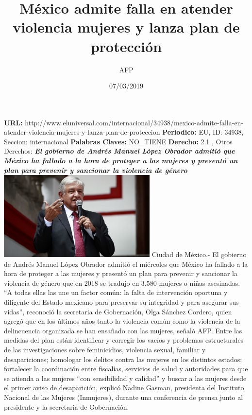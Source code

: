 \documentclass{article}%
\title{\textbf{México admite falla en atender violencia mujeres y lanza plan de protección}}%
\author{AFP}%
\date{07/03/2019}%
\begin{document}
%
\normalsize%
\maketitle%
\textbf{URL: }%
http://www.eluniversal.com/internacional/34938/mexico{-}admite{-}falla{-}en{-}atender{-}violencia{-}mujeres{-}y{-}lanza{-}plan{-}de{-}proteccion\newline%
%
\textbf{Periodico: }%
EU, %
ID: %
34938, %
Seccion: %
internacional\newline%
%
\textbf{Palabras Claves: }%
NO\_TIENE\newline%
%
\textbf{Derecho: }%
2.1%
, Otros Derechos: %
\newline%
%
\textbf{\textit{El gobierno de Andrés Manuel López Obrador admitió que México ha fallado a la hora de proteger a las mujeres y presentó un plan para prevenir y sancionar la violencia de género}}%
\newline%
\newline%
%
\includegraphics[width=300px]{EU_34938.jpg}%
\newline%
%
Ciudad de México.{-} El gobierno de Andrés Manuel López Obrador admitió el miércoles que México ha fallado a la hora de proteger a las mujeres y presentó un plan para prevenir y sancionar la violencia de género que en 2018 se tradujo en 3.580 mujeres o niñas asesinadas.%
\newline%
%
“A todas ellas las une un factor común: la falta de intervención oportuna y diligente del Estado mexicano para preservar su integridad y para asegurar sus vidas”, reconoció la secretaria de Gobernación, Olga Sánchez Cordero, quien agregó que en los últimos años tanto la violencia común como la violencia de la delincuencia organizada se han ensañado con las mujeres, señaló AFP.%
\newline%
%
Entre las medidas del plan están identificar y corregir los vacíos y problemas estructurales de las investigaciones sobre feminicidios, violencia sexual, familiar y desapariciones; homologar los delitos contra las mujeres en los distintos estados; fortalecer la coordinación entre fiscalías, servicios de salud y autoridades para que se atienda a las mujeres “con sensibilidad y calidad” y buscar a las mujeres desde el primer aviso de desaparición, explicó Nadine Gasman, presidenta del Instituto Nacional de las Mujeres (Inmujeres), durante una conferencia de prensa junto al presidente y la secretaria de Gobernación.%
\end{document}
